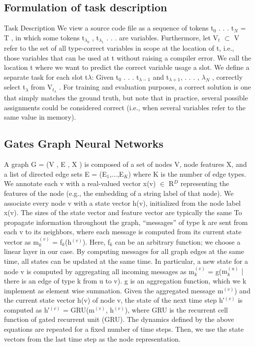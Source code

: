 \documentclass{article}
\begin{document}
\subsection{Formulation of task description}
Task Description We view a source code file as a sequence of tokens t$_0$ . . . t$_N$ = T , in which some tokens t$_{\lambda_0}$ , t$_{\lambda_1}$ . . . are variables. Furthermore, let V$_t$ $\subset$ V refer to the set of all type-correct variables in scope at the location of t, i.e., those variables that can be used at t without raising a compiler error. We call the location t where we want to predict the correct variable usage a slot. We define a separate task for each slot t$\lambda$: Given t$_0$ . . . t$_{\lambda-1}$ and t$_{\lambda+1}$, . . . , $\lambda_N$ , correctly select t$_\lambda$ from V$_{t_\lambda}$ . For training and evaluation purposes, a correct solution is one that simply matches the ground truth, but note that in practice, several possible assignments could be considered correct (i.e., when several variables refer to the same value in memory).

\subsection{Gates Graph Neural Networks}
A graph G = (V , E , X ) is composed of a set of nodes V, node features X, and a list of directed edge sets E = (E$_1$,...,E$_K$) where K is the number of edge types. We annotate each v with a real-valued vector x(v) $\in$ R$^D$ representing the features of the node (e.g., the embedding of a string label of that node). We associate every node v with a state vector h(v), initialized from the node label x(v). The sizes of the state vector and feature vector are typically the same To propagate information throughout the graph, “messages” of type k are sent from each v to its neighbors, where each message is computed from its current state vector as m$_k^{(v)}$ = f$_k$(h$^{(v)}$). Here, f$_k$ can be an arbitrary function; we choose a linear layer in our case. By computing messages for all graph edges at the same time, all states can be updated at the same time. In particular, a new state for a node v is computed by aggregating all incoming messages as m$_k^{(v)}$ = g({m$_k^{(u)}$ | there is an edge of type k from u to v}). g is an aggregation function, which we k implement as element wise summation. Given the aggregated message m$^{(v)}$) and the current state vector h(v) of node v, the state of the next time step h′$^{(v)}$ is computed as h′$^{(v)}$ = GRU(m$^{(v)}$, h$^{(v)}$), where GRU is the recurrent cell function of gated recurrent unit (GRU). The dynamics defined by the above equations are repeated for a fixed number of time steps. Then, we use the state vectors from the last time step as the node representation.
\end{document}
